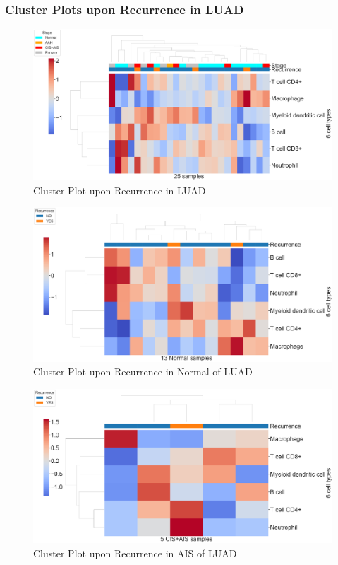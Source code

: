 \documentclass{beamer}
\begin{document}
    \begin{frame}[allowframebreaks]
        \frametitle{Cluster Plots upon Recurrence in LUAD}

        \begin{figure}
            \includegraphics[width=0.9 \linewidth]{figures/TIMER/Clustermap/STAR.FPKM.ADC.Recurrence/TIMER-All.pdf}
            \caption{Cluster Plot upon Recurrence in LUAD}
        \end{figure}

         \begin{figure}
            \includegraphics[width=0.9 \linewidth]{figures/TIMER/Clustermap/STAR.FPKM.ADC.Recurrence/TIMER-Normal.pdf}
            \caption{Cluster Plot upon Recurrence in Normal of LUAD}
        \end{figure}

        \begin{figure}
            \includegraphics[width=0.9 \linewidth]{figures/TIMER/Clustermap/STAR.FPKM.ADC.Recurrence/TIMER-CIS+AIS.pdf}
            \caption{Cluster Plot upon Recurrence in AIS of LUAD}
        \end{figure}


\end{frame}
\end{document}
